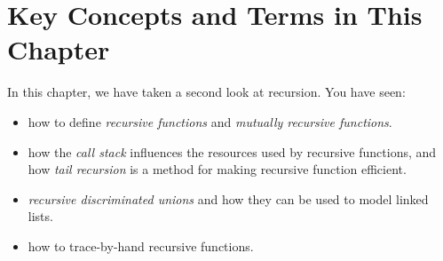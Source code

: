 \documentclass[fsharpNotes.tex]{subfiles}
\begin{document}
\section{Key Concepts and Terms in This Chapter}
In this chapter, we have taken a second look at recursion. You have seen:
\begin{itemize}
\item how to define \emph{recursive functions} and \emph{mutually recursive functions}.
\item how the \emph{call stack} influences the resources used by recursive functions, and how \emph{tail recursion} is a method for making recursive function efficient.
\item \emph{recursive discriminated unions} and how they can be used to model linked lists.
\item how to trace-by-hand recursive functions.
\end{itemize}
\end{document}
